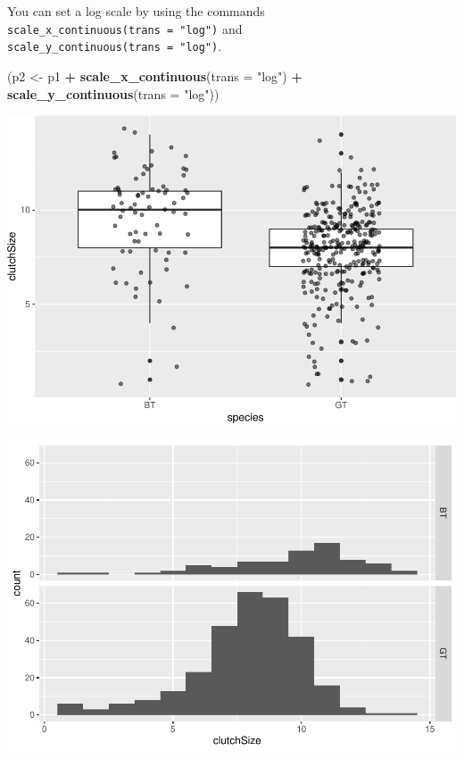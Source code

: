 \documentclass[
  a4paperpaper,
]{book}
\newenvironment{Shaded}{\begin{snugshade}}{\end{snugshade}}
\newcommand{\DataTypeTok}[1]{\textcolor[rgb]{0.13,0.29,0.53}{#1}}
\newcommand{\KeywordTok}[1]{\textcolor[rgb]{0.13,0.29,0.53}{\textbf{#1}}}
\newcommand{\NormalTok}[1]{#1}
\newcommand{\OperatorTok}[1]{\textcolor[rgb]{0.81,0.36,0.00}{\textbf{#1}}}
\newcommand{\StringTok}[1]{\textcolor[rgb]{0.31,0.60,0.02}{#1}}
\begin{document}
You can set a log scale by using the commands \texttt{scale\_x\_continuous(trans\ =\ "log")} and \texttt{scale\_y\_continuous(trans\ =\ "log")}.

\begin{Shaded}
\begin{Highlighting}[]
\NormalTok{(p2 \textless{}{-}}\StringTok{ }\NormalTok{p1 }\OperatorTok{+}\StringTok{ }
\StringTok{  }\KeywordTok{scale\_x\_continuous}\NormalTok{(}\DataTypeTok{trans =} \StringTok{"log"}\NormalTok{) }\OperatorTok{+}
\StringTok{  }\KeywordTok{scale\_y\_continuous}\NormalTok{(}\DataTypeTok{trans =} \StringTok{"log"}\NormalTok{))}
\end{Highlighting}
\end{Shaded}

\begin{center}\includegraphics{BB852_files/figure-latex/unnamed-chunk-112-1} \end{center}

\begin{center}\includegraphics{BB852_files/figure-latex/unnamed-chunk-113-1} \end{center}
\end{document}
